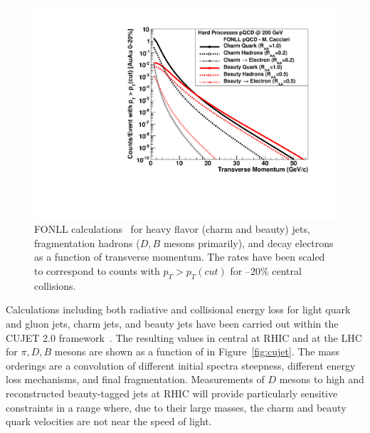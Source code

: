 \begin{figure}[!hbt]
 \begin{center}
    \includegraphics[width=0.7\linewidth]{figs/fig_pqcdrates_heavyflavor_auau}
    \caption[FONLL calculations of heavy flavor jets, fragmentation
    hadrons, and decay electrons vs \pt]{\label{fig:heavyrates}FONLL
      calculations~\cite{Cacciariprivate} for heavy flavor (charm and
      beauty) jets, fragmentation hadrons ($D, B$ mesons primarily),
      and decay electrons as a function of transverse momentum.  The
      rates have been scaled to correspond to counts with $p_{T} >
      p_{T}(cut)$ for --20\% central collisions.}
 \end{center}
\end{figure}

Calculations including both radiative and collisional energy loss for
light quark and gluon jets, charm jets, and beauty jets have been
carried out within the CUJET 2.0 framework~\cite{Xu:2014ica}.  The
resulting \raa values in central \auau at RHIC and \pbpb at the LHC
for $\pi, D, B$ mesons are shown as a function of \pt in
Figure~\ref{fig:cujet}.  The mass orderings are a convolution of
different initial spectra steepness, different energy loss mechanisms,
and final fragmentation.  Measurements of $D$ mesons to high \pt and
reconstructed beauty-tagged jets at RHIC will provide particularly
sensitive constraints in a range where, due to their large masses, the
charm and beauty quark velocities are not near the speed of light.

